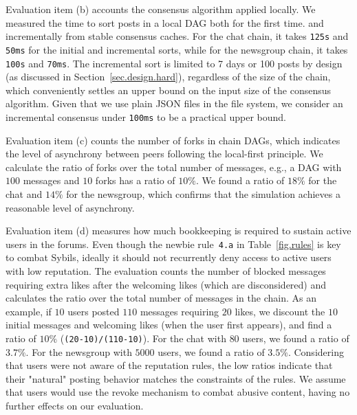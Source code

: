 \documentclass[12pt]{article}
\newcommand{\code}[1]  {\texttt{\footnotesize{#1}}}
\begin{document}
Evaluation item (b) accounts the consensus algorithm applied locally.
We measured the time to sort posts in a local DAG both for the first time.
and incrementally from stable consensus caches.
%
For the chat chain, it takes \texttt{125s} and \texttt{50ms} for the initial
and incremental sorts,
while for the newsgroup chain, it takes
\texttt{100s} and \texttt{70ms}.
%
%
The incremental sort is limited to 7 days or 100 posts by design (as discussed
in Section~\ref{sec.design.hard}), regardless of the size of the chain, which
conveniently settles an upper bound on the input size of the consensus
algorithm.
%
Given that we use plain JSON files in the file system, we consider an
incremental consensus under \texttt{100ms} to be a practical upper bound.

Evaluation item (c) counts the number of forks in chain DAGs, which indicates
the level of asynchrony between peers following the local-first principle.
We calculate the ratio of forks over the total number of messages, e.g., a DAG
with $100$ messages and $10$ forks has a ratio of $10\%$.
We found a ratio of $18\%$ for the chat and $14\%$ for the newsgroup, which
confirms that the simulation achieves a reasonable level of asynchrony.

Evaluation item (d) measures how much bookkeeping is required to sustain active
users in the forums.
Even though the newbie rule~\code{4.a} in Table~\ref{fig.rules} is key to
combat Sybils, ideally it should not recurrently deny access to active users
with low reputation.
%
The evaluation counts the number of blocked messages requiring extra likes
after the welcoming likes (which are disconsidered) and calculates the ratio
over the total number of messages in the chain.
As an example, if $10$ users posted $110$ messages requiring $20$ likes, we
discount the $10$ initial messages and welcoming likes (when the user first
appears), and find a ratio of $10\%$ (\code{(20-10)/(110-10)}).
%
For the chat with $80$ users, we found a ratio of $3.7\%$.
For the newsgroup with $5000$ users, we found a ratio of $3.5\%$.
%
Considering that users were not aware of the reputation rules, the low ratios
indicate that their "natural" posting behavior matches the constraints of the
rules.
%
We assume that users would use the revoke mechanism to combat abusive content,
having no further effects on our evaluation.
\end{document}
